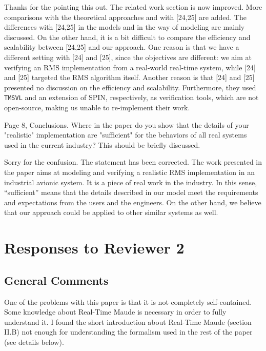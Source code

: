 \documentclass[10pt,journal]{IEEEtran}
\newcommand{\ANSWER}{\medskip\noindent{\bf RESPONSE: }}
\newcommand{\COMMENT}{\medskip\noindent{\bf COMMENT: }}
\begin{document}
\ANSWER 

Thanks for the pointing this out. The related work section is now
improved. More comparisons with the theoretical approaches and with
[24,25] are added. The differences with [24,25] in the models and in
the way of modeling are mainly discussed. On the other hand, it is a
bit difficult to compare the efficiency and scalability between
[24,25] and our approach. One reason is that we have a different
setting with [24] and [25], since the objectives are different: we aim
at verifying an RMS implementation from a real-world real-time system,
while [24] and [25] targeted the RMS algorithm itself. Another reason
is that [24] and [25] presented no discussion on the efficiency and
scalability. Furthermore, they used \verb|TMSVL| and an extension of
SPIN, respectively, as verification tools, which are not open-source,
making us unable to re-implement their work.

\COMMENT 

Page 8, Conclusions. Where in the paper do you show that the details
of your "realistic" implementation are "sufficient" for the behaviors
of all real systems used in the current industry? This should be
briefly discussed.

\ANSWER 

Sorry for the confusion. The statement has been corrected. The work
presented in the paper aims at modeling and verifying a realistic RMS
implementation in an industrial avionic system. It is a piece of real
work in the industry. In this sense, ``sufficient'' means that the
details described in our model meet the requirements and expectations
from the users and the engineers. On the other hand, we believe that
our approach could be applied to other similar systems as well.


\section{Responses to Reviewer 2}
\subsection{General Comments}

\COMMENT 

One of the problems with this paper is that it is not completely
self-contained.  Some knowledge about Real-Time Maude is necessary in
order to fully understand it.  I found the short introduction about
Real-Time Maude (section II.B) not enough for understanding the
formalism used in the rest of the paper (see details below).
\end{document}

